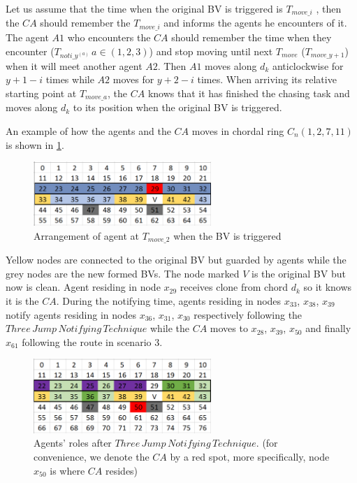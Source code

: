 Let us assume that the time when the original BV is triggered is $T_{move\_i}$ , then the $CA$ should remember the $T_{move\_i}$ and informs the agents he encounters of it. The agent $A1$ who encounters the $CA$ should remember the time when they encounter ($T_{noti\_y^{(a)}}\,a\in(1,2,3)$) and stop moving until next $T_{move}$ ($T_{move\_{y+1}}$) when it will meet another agent $A2$. Then $A1$ moves along $d_k$ anticlockwise for $y+1-i$ times while $A2$ moves for $y+2-i$ times. 
When arriving its relative starting point at $T_{move\_a}$, the $CA$ knows that it has finished the chasing task and moves along $d_k$ to its position when the original BV is triggered.

An example of how the agents and the $CA$ moves in chordal ring $C_n(1, 2, 7, 11)$is shown in \ref{fig:T29}. 
\begin{figure}[H]
  \centering  
  \includegraphics[width=0.6\textwidth]{figures/T29.png}
  \caption{Arrangement of agent at $T_{move\_2}$ when the BV is triggered}\label{fig:T29}
\end{figure}

Yellow nodes are connected to the original BV but guarded by agents while the grey nodes are the new formed BVs. The node marked $V$ is the original BV but now is clean. Agent residing in node $x_{29}$ receives clone from chord $d_k$ so it knows it is the $CA$. During the notifying time, agents residing in nodes $x_{33}$, $x_{38}$, $x_{39}$ notify agents residing in nodes $x_{36}$, $x_{31}$, $x_{30}$ respectively following the $Three\,Jump\,Notifying\,Technique$ while the $CA$ moves to $x_{28}$, $x_{39}$, $x_{50}$ and finally $x_{61}$ following the route in scenario 3.

\begin{figure}[H]
  \centering  
  \includegraphics[width=0.6\textwidth]{figures/T50.png}
  \caption{Agents' roles after $Three\,Jump\,Notifying\,Technique$. (for convenience, we denote the $CA$ by a red spot, more specifically, node $x_{50}$ is where $CA$ resides)}\label{fig:T50}
\end{figure}

